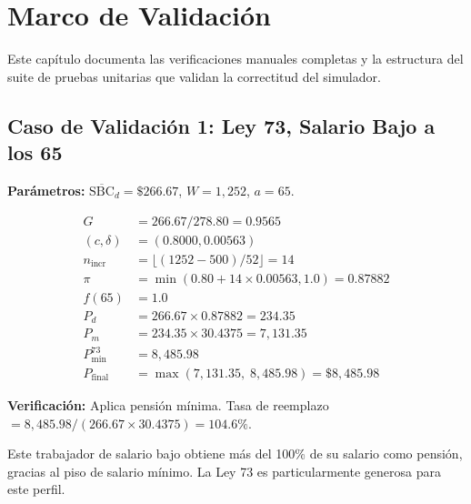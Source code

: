 \documentclass[11pt,a4paper]{report}
\theoremstyle{remark}
\begin{document}
\chapter{Marco de Validaci\'on}

Este cap\'itulo documenta las verificaciones manuales completas y la estructura del suite de pruebas unitarias que validan la correctitud del simulador.

\section{Caso de Validaci\'on 1: Ley 73, Salario Bajo a los 65}

\begin{tcolorbox}[colback=blue!5!white, colframe=blue!75!black, title=\textbf{Definici\'on Formal}]
\textbf{Par\'ametros:} $\overline{\text{SBC}}_d = \$266.67$, $W = 1{,}252$, $a = 65$.

\begin{align}
G &= 266.67 / 278.80 = 0.9565 \\
(c, \delta) &= (0.8000, 0.00563) \\
n_{\text{incr}} &= \lfloor (1252-500)/52 \rfloor = 14 \\
\pi &= \min(0.80 + 14 \times 0.00563, 1.0) = 0.87882 \\
f(65) &= 1.0 \\
P_d &= 266.67 \times 0.87882 = 234.35 \\
P_m &= 234.35 \times 30.4375 = 7{,}131.35 \\
P_{\min}^{73} &= 8{,}485.98 \\
P_{\text{final}} &= \max(7{,}131.35, \; 8{,}485.98) = \boxed{\$8{,}485.98}
\end{align}

\textbf{Verificaci\'on:} Aplica pensi\'on m\'inima. Tasa de reemplazo $= 8{,}485.98 / (266.67 \times 30.4375) = 104.6\%$.
\end{tcolorbox}

\begin{tcolorbox}[colback=green!5!white, colframe=green!50!black, title=\textbf{Intuici\'on}]
Este trabajador de salario bajo obtiene m\'as del 100\% de su salario como pensi\'on, gracias al piso de salario m\'inimo. La Ley 73 es particularmente generosa para este perfil.
\end{tcolorbox}
\end{document}
